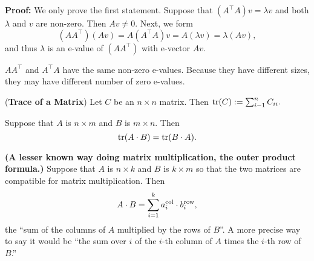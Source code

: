 \textbf{Proof:} We only prove the first statement. Suppose that $\left(A^\top A \right)v = \lambda v$ and both $\lambda$ and $v$ are non-zero. Then $Av \neq 0$. Next, we form 
$$\left(A A^\top \right) \left(A v \right)= A  \left( A^\top A\right)  v = A \left(\lambda v\right) = \lambda \left(Av\right),$$ 
and thus $\lambda$ is an e-value of $\left(A A^\top \right)$ with e-vector $Av$.

\Qed

\begin{cor} $A A^\top$ and $A^\top A$ have the same non-zero e-values. Because they have different sizes, they may have different number of zero e-values. 
\end{cor}

\begin{definition}(\textbf{Trace of a Matrix}) Let $C$ be an $n \times n$ matrix. Then $\operatorname*{\rm tr}(C):=\sum_{i-1}^n C_{ii}.$
\end{definition}

\begin{exercise} Suppose that $A$ is $n \times m$ and $B$ is $m \times n$. Then
$$\operatorname*{\rm tr}(A\cdot B) = \operatorname*{\rm tr}(B \cdot A). $$

\end{exercise}

 
\begin{fact}
\label{fact:MatMultiplyAlternative}
\textbf{(A lesser known way doing matrix multiplication, the outer product formula.)}  Suppose that $A$ is $n \times k$ and $B$ is $k \times m$ so that the two matrices are compatible for matrix multiplication. Then 
$$A\cdot B = \sum_{i=1}^{k} a_i^{\rm col} \cdot b_i^{\rm row},  $$
the ``sum of the columns of $A$ multiplied by the rows of $B$''. A more precise way to say it would be ``the sum over $i$ of the $i$-th column of $A$ times the $i$-th row of $B$.'' 
\end{fact}

